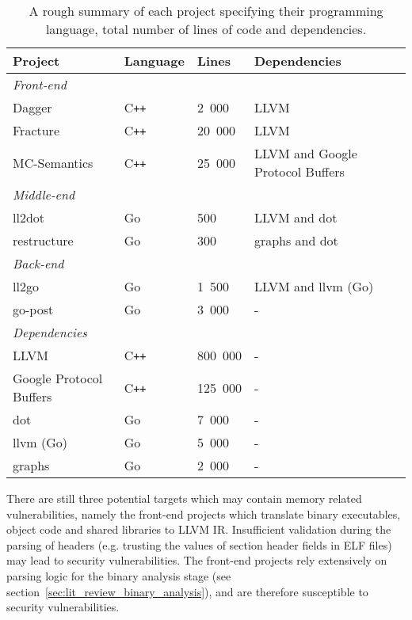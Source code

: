 \begin{table}[htbp]
	\begin{center}
		\begin{tabular}{|l|l|l|l|}
			\hline
			\textbf{Project} & \textbf{Language} & \textbf{Lines} & \textbf{Dependencies} \\
			\hline
			\multicolumn{4}{|l|}{\hspace{4ex} \textit{Front-end}} \\
			\hline
			Dagger & C\texttt{++} & 2~000 & LLVM \\
			Fracture & C\texttt{++} & 20~000 & LLVM \\
			MC-Semantics & C\texttt{++} & 25~000 & LLVM and Google Protocol Buffers \\
			\hline
			\multicolumn{4}{|l|}{\hspace{4ex} \textit{Middle-end}} \\
			\hline
			ll2dot & Go & 500 & LLVM and dot \\
			restructure & Go & 300 & graphs and dot \\
			\hline
			\multicolumn{4}{|l|}{\hspace{4ex} \textit{Back-end}} \\
			\hline
			ll2go & Go & 1~500 & LLVM and llvm (Go) \\
			go-post & Go & 3~000 & - \\
			\hline
			\multicolumn{4}{|l|}{\hspace{4ex} \textit{Dependencies}} \\
			\hline
			LLVM & C\texttt{++} & 800~000 & - \\
			Google Protocol Buffers & C\texttt{++} & 125~000 & - \\
			dot & Go & 7~000 & - \\
			llvm (Go) & Go & 5~000 & - \\
			graphs & Go & 2~000 & - \\
			\hline
		\end{tabular}
	\end{center}
	\caption{A rough summary of each project specifying their programming language, total number of lines of code and dependencies.}
	\label{tbl:loc_summary}
\end{table}

There are still three potential targets which may contain memory related vulnerabilities, namely the front-end projects which translate binary executables, object code and shared libraries to LLVM IR. Insufficient validation during the parsing of headers (e.g. trusting the values of section header fields in ELF files) may lead to security vulnerabilities. The front-end projects rely extensively on parsing logic for the binary analysis stage (see section~\ref{sec:lit_review_binary_analysis}), and are therefore susceptible to security vulnerabilities.

